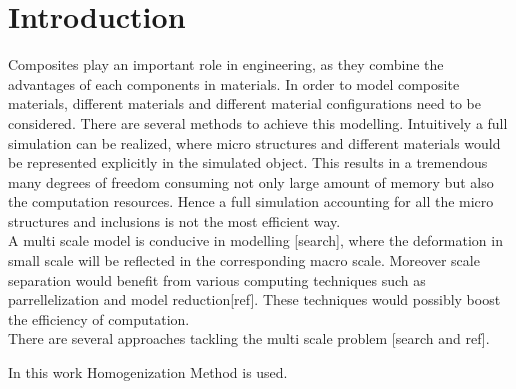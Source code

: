 %
%

\chapter{Introduction}

Composites play an important role in engineering, as they combine the advantages of each components in materials. In order to model composite materials, different materials and different material configurations need to be considered. There are several methods to achieve this modelling. Intuitively a full simulation can be realized, where micro structures and different materials would be represented explicitly in the simulated object. This results in a tremendous many degrees of freedom consuming not only large amount of memory but also the computation resources. Hence a full simulation accounting for all the micro structures and inclusions is not the most efficient way.\\

A multi scale model is conducive in modelling [search], where the deformation in small scale will be reflected in the corresponding macro scale. Moreover scale separation would benefit from various computing techniques such as parrellelization and model reduction[ref]. These techniques would possibly boost the efficiency of computation. \\

There are several approaches tackling the multi scale problem [search and ref].

In this work Homogenization Method is used.


%

